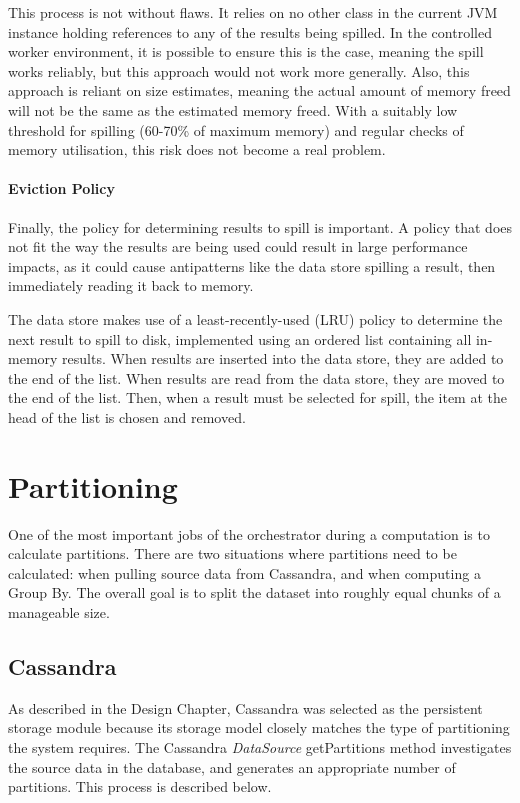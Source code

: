This process is not without flaws. It relies on no other class in the current JVM instance holding references to any of the results being spilled. In the controlled worker environment, it is possible to ensure this is the case, meaning the spill works reliably, but this approach would not work more generally. Also, this approach is reliant on size estimates, meaning the actual amount of memory freed will not be the same as the estimated memory freed. With a suitably low threshold for spilling (60-70\% of maximum memory) and regular checks of memory utilisation, this risk does not become a real problem.

\paragraph{Eviction Policy}
Finally, the policy for determining results to spill is important. A policy that does not fit the way the results are being used could result in large performance impacts, as it could cause antipatterns like the data store spilling a result, then immediately reading it back to memory.

The data store makes use of a least-recently-used (LRU) policy to determine the next result to spill to disk, implemented using an ordered list containing all in-memory results. When results are inserted into the data store, they are added to the end of the list. When results are read from the data store, they are moved to the end of the list. Then, when a result must be selected for spill, the item at the head of the list is chosen and removed.



\section{Partitioning}
One of the most important jobs of the orchestrator during a computation is to calculate partitions. There are two situations where partitions need to be calculated: when pulling source data from Cassandra, and when computing a Group By. The overall goal is to split the dataset into roughly equal chunks of a manageable size. 

\subsection{Cassandra}
As described in the Design Chapter, Cassandra was selected as the persistent storage module because its storage model closely matches the type of partitioning the system requires. The Cassandra \textit{DataSource} getPartitions method investigates the source data in the database, and generates an appropriate number of partitions. This process is described below.


